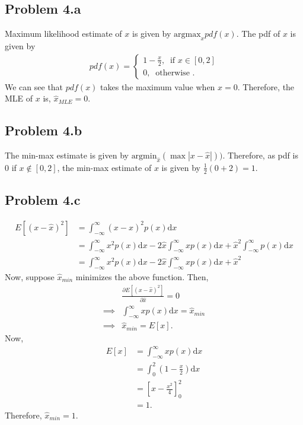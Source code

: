\subsection*{Problem 4.a}
Maximum likelihood estimate of $x$ is given by $\text{argmax}_x pdf(x)$. The pdf of $x$ is given by
\begin{align*}
	pdf(x) = \begin{cases}
		1-\frac{x}{2},\ \text{ if }x \in [0,2]\\
		0,\ \text{ otherwise }.
	\end{cases}
\end{align*}
We can see that $pdf(x)$ takes the maximum value when $x=0$. Therefore, the MLE of $x$ is, $\hat{x}_{MLE} = 0$.
\subsection*{Problem 4.b}
The min-max estimate is given by $\text{argmin}_{\hat{x}}(\max|x-\hat{x}|))$. Therefore, as pdf is $0$ if $x \notin [0,2]$, the min-max estimate of $x$ is given by $\frac{1}{2}(0+2) = 1$.
\subsection*{Problem 4.c}
\begin{align*}
	E[(x-\hat{x})^2] &= \int_{-\infty}^{\infty} (x-\hat{x})^2p(x)\text{d}x\\
	&= \int_{-\infty}^{\infty}x^2p(x)\text{d}x-2\hat{x}\int_{-\infty}^{\infty}xp(x)\text{d}x+\hat{x}^2\int_{-\infty}^{\infty}p(x)\text{d}x\\
	&= \int_{-\infty}^{\infty}x^2p(x)\text{d}x-2\hat{x}\int_{-\infty}^{\infty}xp(x)\text{d}x+\hat{x}^2
\end{align*}
Now, suppose $\hat{x}_{min}$ minimizes the above function. Then,
\begin{align*}
	&\frac{\partial E[(x-\hat{x})^2]}{\partial \hat{x}} = 0\\
	\implies & \int_{-\infty}^{\infty}xp(x)\text{d}x = \hat{x}_{min}\\
	\implies & \hat{x}_{min} = E[x].
\end{align*}
Now,
\begin{align*}
	E[x] &= \int_{-\infty}^{\infty} xp(x)\text{d}x\\
	&= \int_{0}^{2}(1-\frac{x}{2})\text{d}x\\
	&= \left[x-\frac{x^2}{4}\right]_0^2\\
	&= 1.
\end{align*}
Therefore, $\hat{x}_{min} = 1.$
